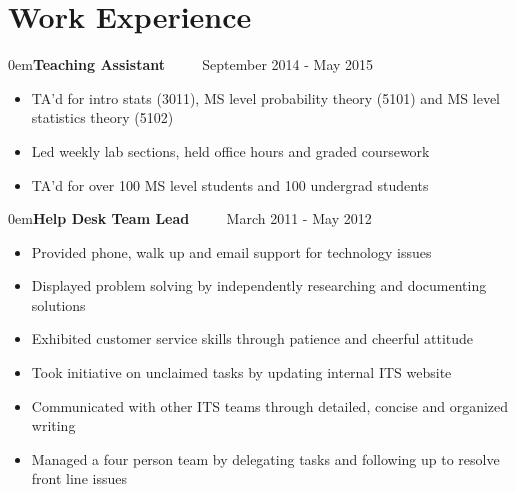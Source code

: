 \documentclass[10pt]{article}
\newenvironment{am}{\begin{addmargin}[1em]{0em}}{\end{addmargin}}
\newcommand{\Experience}[3]{\begin{am}\textbf{#1} \ \ \ \ \emph{{\color{LightGray}{#2}}} \hfill {#3} \end{am}}
\begin{document}
\section*{Work Experience}

\Experience{Teaching Assistant}{University of Minnesota}{September 2014 - May
2015}
\begin{itemize}[noitemsep]
  \item TA'd for intro stats (3011), MS level probability theory
    (5101) and MS level
    statistics theory (5102)
  \item Led weekly lab sections, held office hours and graded coursework
  \item TA'd for over 100 MS level students and 100 undergrad students
\end{itemize}

\Experience{Help Desk Team Lead}{Bethel University ITS}{March 2011 - May 2012}
\begin{itemize}[noitemsep]
 \item Provided phone, walk up and email support for technology issues
 \item Displayed problem solving by independently researching and documenting solutions
 \item Exhibited customer service skills through patience and cheerful attitude
 \item Took initiative on unclaimed tasks by updating internal ITS website
 \item Communicated with other ITS teams through detailed, concise and organized writing
 \item Managed a four person team by delegating tasks and following up to resolve front line issues
\end{itemize}




\end{document}
